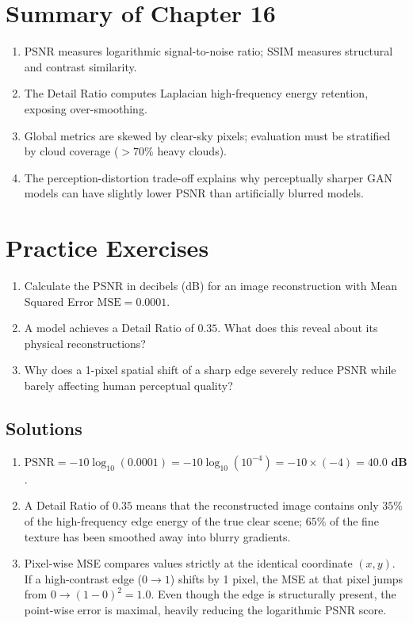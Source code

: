 \section{Summary of Chapter 16}
\begin{enumerate}
    \item PSNR measures logarithmic signal-to-noise ratio; SSIM measures structural and contrast similarity.
    \item The Detail Ratio computes Laplacian high-frequency energy retention, exposing over-smoothing.
    \item Global metrics are skewed by clear-sky pixels; evaluation must be stratified by cloud coverage ($>70\%$ heavy clouds).
    \item The perception-distortion trade-off explains why perceptually sharper GAN models can have slightly lower PSNR than artificially blurred models.
\end{enumerate}

\section{Practice Exercises}
\begin{enumerate}
    \item Calculate the PSNR in decibels (dB) for an image reconstruction with Mean Squared Error $\text{MSE} = 0.0001$.
    \item A model achieves a Detail Ratio of $0.35$. What does this reveal about its physical reconstructions?
    \item Why does a 1-pixel spatial shift of a sharp edge severely reduce PSNR while barely affecting human perceptual quality?
\end{enumerate}

\subsection*{Solutions}
\begin{enumerate}
    \item $\text{PSNR} = -10 \log_{10}(0.0001) = -10 \log_{10}(10^{-4}) = -10 \times (-4) = \mathbf{40.0\text{ dB}}$.
    \item A Detail Ratio of $0.35$ means that the reconstructed image contains only $35\%$ of the high-frequency edge energy of the true clear scene; $65\%$ of the fine texture has been smoothed away into blurry gradients.
    \item Pixel-wise MSE compares values strictly at the identical coordinate $(x, y)$. If a high-contrast edge ($0 \to 1$) shifts by 1 pixel, the MSE at that pixel jumps from $0 \to (1 - 0)^2 = 1.0$. Even though the edge is structurally present, the point-wise error is maximal, heavily reducing the logarithmic PSNR score.
\end{enumerate}
